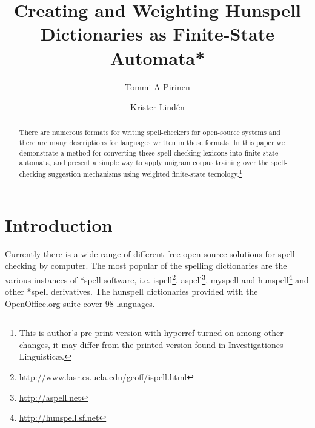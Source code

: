 \documentclass[a4paper,runningheads]{llncs}
\begin{document}
\mainmatter

\title{Creating and Weighting Hunspell Dictionaries as Finite-State Automata*
    }


\author{Tommi A Pirinen \and Krister Lind\'{e}n}



\maketitle

\begin{abstract}
  There are numerous formats for writing spell-checkers for
  open-source systems and there are many descriptions for languages
  written in these formats. In this paper we
  demonstrate a method for converting these spell-checking lexicons
  into finite-state automata, and present a simple way to apply unigram
  corpus training over the spell-checking suggestion mechanisms using
  weighted finite-state tecnology.\footnote{This is author's pre-print version with hyperref turned on among other
    changes, it may differ from the printed version found in Investigationes
Linguistic\ae{}.}
\end{abstract}


\section{Introduction}
\label{sec:introduction}

Currently there is a wide range of different free open-source
solutions for spell-checking by computer. The most popular of the spelling
dictionaries are the various instances of *spell software, i.e.
ispell\footnote{\url{http://www.lasr.cs.ucla.edu/geoff/ispell.html}},
aspell\footnote{\url{http://aspell.net}}, myspell and
hunspell\footnote{\url{http://hunspell.sf.net}} and other *spell
derivatives. The hunspell dictionaries
provided with the OpenOffice.org suite cover 98 languages.
\end{document}
